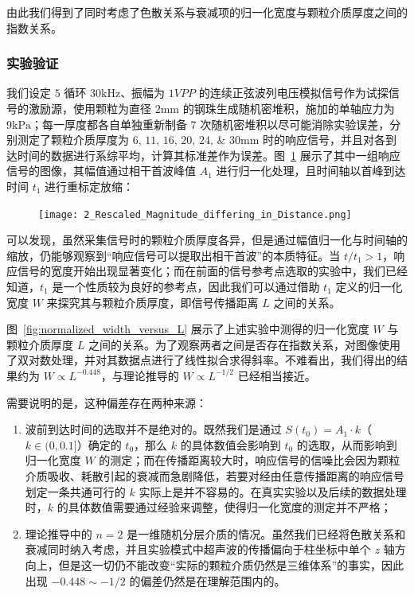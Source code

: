 由此我们得到了同时考虑了色散关系与衰减项的归一化宽度与颗粒介质厚度之间的指数关系。

\subsubsection{实验验证}

我们设定 $5$ 循环 $30\unit{\kilo\Hz}$、振幅为 $1\unit{VPP}$ 的连续正弦波列电压模拟信号作为试探信号的激励源，使用颗粒为直径 $2\unit{\milli\meter}$ 的钢珠生成随机密堆积，施加的单轴应力为 $9\unit{\kilo\Pa}$；每一厚度都各自单独重新制备 7 次随机密堆积以尽可能消除实验误差，分别测定了颗粒介质厚度为 $\numlist{6;11;16;20;24;30}\unit{\milli\metre}$ 时的响应信号，并且对各到达时间的数据进行系综平均，计算其标准差作为误差。图~\ref{fig:reference_point} 展示了其中一组响应信号的图像，其幅值通过相干首波峰值 $A_{1}$ 进行归一化处理，且时间轴以首峰到达时间 $t_{1}$ 进行重标定放缩：

\begin{figure}[!htp]
  \centering
  \texttt{[image: 2\_Rescaled\_Magnitude\_differing\_in\_Distance.png]}
  \label{fig:reference_point}
\end{figure}

可以发现，虽然采集信号时的颗粒介质厚度各异，但是通过幅值归一化与时间轴的缩放，仍能够观察到“响应信号可以提取出相干首波”的本质特征。当 $t/t_{1} > 1$，响应信号的宽度开始出现显著变化；而在前面的信号参考点选取的实验中，我们已经知道，$t_{1}$ 是一个性质较为良好的参考点，因此我们可以通过借助 $t_{1}$ 定义的归一化宽度 $W$ 来探究其与颗粒介质厚度，即信号传播距离 $L$ 之间的关系。

图~\ref{fig:normalized_width_versus_L} 展示了上述实验中测得的归一化宽度 $W$ 与颗粒介质厚度 $L$ 之间的关系。为了观察两者之间是否存在指数关系，对图像使用了双对数处理，并对其数据点进行了线性拟合求得斜率。不难看出，我们得出的结果约为 $W\propto L^{-0.448}$，与理论推导的 $W\propto L^{-1/2}$ 已经相当接近。

需要说明的是，这种偏差存在两种来源：

\begin{enumerate}
  \item 波前到达时间的选取并不是绝对的。既然我们是通过 $S(t_{0}) = A_{1}\cdot k$（$k\in(0,0.1]$）确定的 $t_{0}$，那么 $k$ 的具体数值会影响到 $t_{0}$ 的选取，从而影响到归一化宽度 $W$ 的测定；而在传播距离较大时，响应信号的信噪比会因为颗粒介质吸收、耗散引起的衰减而急剧降低，若要对经由任意传播距离的响应信号划定一条共通可行的 $k$ 实际上是并不容易的。在真实实验以及后续的数据处理时，$k$ 的具体数值需要通过经验来调整，使得归一化宽度的测定并不严格；
  \item 理论推导中的 $n=2$ 是一维随机分层介质的情况。虽然我们已经将色散关系和衰减同时纳入考虑，并且实验模式中超声波的传播偏向于柱坐标中单个 $z$ 轴方向上，但是这一切仍不能改变“实际的颗粒介质仍然是三维体系”的事实，因此出现 $-0.448\sim-1/2$ 的偏差仍然是在理解范围内的。
\end{enumerate}


